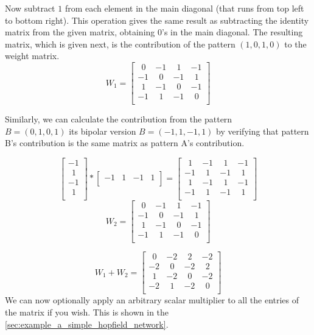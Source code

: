 \documentclass[12pt, right open]{memoir}
\newcommand{\matplus}
{
~~
}
\begin{document}
Now subtract $1$ from each element in the main diagonal (that runs from top left
to bottom right). This operation gives the same result as subtracting the
identity matrix from the given matrix, obtaining $0$’s in the main diagonal. The
resulting matrix, which is given next, is the contribution of the pattern $(1, 0, 1,
0)$ to the weight matrix.
\[
 W_1 = \begin{bmatrix}
 \matplus0 & -1 &  \matplus1 & -1 \\
-1 &  \matplus0 & -1 &  \matplus1 \\
 \matplus1 & -1 &  \matplus0 & -1 \\
-1 &  \matplus1 & -1 &  \matplus0 \\
\end{bmatrix}
\]

Similarly, we can calculate the contribution from the pattern \\ $B = (0, 1, 0, 1)$ its bipolar version $B = (-1, 1, -1, 1)$ by verifying that pattern B's contribution is the same matrix as pattern A's contribution.

\[ 
\begin{bmatrix}
 -1  \\
  \matplus1  \\
 -1  \\
  \matplus1  \\
\end{bmatrix}
*
\begin{bmatrix}
 -1 & 1 & -1 & 1  \\
\end{bmatrix}
=
\begin{bmatrix}
 \matplus1 & -1 &  \matplus1 & -1 \\
-1 &  \matplus1 & -1 &  \matplus1 \\
 \matplus1 & -1 &  \matplus1 & -1 \\
-1 &  \matplus1 & -1 &  \matplus1 \\
\end{bmatrix}
\]
\[
W_2 =
\begin{bmatrix}
 \matplus0 & -1 &  \matplus1 & -1 \\
-1 &  \matplus0 & -1 &  \matplus1 \\
 \matplus1 & -1 &  \matplus0 & -1 \\
-1 &  \matplus1 & -1 &  \matplus0 \\
\end{bmatrix}
\]

\[
W_1 + W_2 =
\begin{bmatrix}
 \matplus0 & -2 &  \matplus2 & -2 \\
-2 &  \matplus0 & -2 &  \matplus2 \\
 \matplus1 & -2 &  \matplus0 & -2 \\
-2 &  \matplus1 & -2 &  \matplus0 \\
\end{bmatrix}
\]
We can now optionally apply an arbitrary scalar multiplier to all the entries of
the matrix if you wish. This is shown in the \ref{sec:example_a_simple_hopfield_network}.
\end{document}
